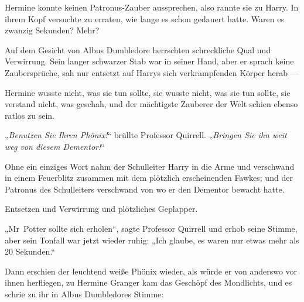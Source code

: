 Hermine konnte keinen Patronus-Zauber aussprechen, also rannte sie zu Harry. In ihrem Kopf versuchte zu erraten, wie lange es schon gedauert hatte. Waren es zwanzig Sekunden? Mehr?

Auf dem Gesicht von Albus Dumbledore herrschten schreckliche Qual und Verwirrung. Sein langer schwarzer Stab war in seiner Hand, aber er sprach keine Zaubersprüche, sah nur entsetzt auf Harrys sich verkrampfenden Körper herab —

Hermine wusste nicht, was sie tun sollte, sie wusste nicht, was sie tun sollte, sie verstand nicht, was geschah, und der mächtigste Zauberer der Welt schien ebenso ratlos zu sein.

„\emph{Benutzen Sie Ihren Phönix!}“ brüllte Professor Quirrell.
„\emph{Bringen Sie ihn weit weg von diesem Dementor!}“

Ohne ein einziges Wort nahm der Schulleiter Harry in die Arme und verschwand in einem Feuerblitz zusammen mit dem plötzlich erscheinenden Fawkes; und der Patronus des Schulleiters verschwand von wo er den Dementor bewacht hatte.

Entsetzen und Verwirrung und plötzliches Geplapper.

„Mr~Potter sollte sich erholen“, sagte Professor Quirrell und erhob seine Stimme, aber sein Tonfall war jetzt wieder ruhig:
„Ich glaube, es waren nur etwas mehr als 20 Sekunden.“

Dann erschien der leuchtend weiße Phönix wieder, als würde er von anderswo vor ihnen herfliegen, zu Hermine Granger kam das Geschöpf des Mondlichts, und es schrie zu ihr in Albus Dumbledores Stimme:


